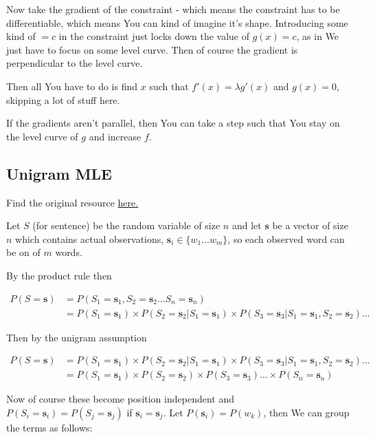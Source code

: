 \documentclass{article}
\begin{document}
		Now take the gradient of the constraint - which means the constraint has to be differentiable, which means You can kind of imagine it's shape. Introducing some kind of $=c$ in the constraint just locks down the value of $g(x)=c$, as in We just have to focus on some level curve. Then of course the gradient is perpendicular to the level curve.
		
		Then all You have to do is find $x$ such that $f'(x) = \lambda g'(x)$ and $g(x)=0$, skipping a lot of stuff here.
		
		If the gradients aren't parallel, then You can take a step such that You stay on the level curve of $g$ and increase $f$.
		
	\subsection{Unigram MLE}
	
		Find the original resource \href{https://leimao.github.io/blog/Maximum-Likelihood-Estimation-Ngram/}{here.}
		
		Let $S$ (for sentence) be the random variable of size $n$ and let $\mathbf{s}$ be a vector of size $n$ which contains actual observations, $\mathbf{s}_i\in\{ w_1\ldots w_m \}$, so each observed word can be on of $m$ words.
		
		By the product rule then
		
		\begin{align}
			P(S=\mathbf{s}) &= P(S_1=\mathbf{s}_1, S_2=\mathbf{s}_2\ldots S_n=\mathbf{s}_n)\\
			&= P(S_1=\mathbf{s}_1)\times P(S_2=\mathbf{s}_2 | S_1=\mathbf{s}_1) \times P(S_3=\mathbf{s}_3 | S_1=\mathbf{s}_1, S_2=\mathbf{s}_2)...
		\end{align}		
			
		Then by the unigram assumption
		
		\begin{align}
			P(S=\mathbf{s}) &= P(S_1=\mathbf{s}_1)\times P(S_2=\mathbf{s}_2 | S_1=\mathbf{s}_1) \times P(S_3=\mathbf{s}_3 | S_1=\mathbf{s}_1, S_2=\mathbf{s}_2)...\\
			&= P(S_1=\mathbf{s}_1)\times P(S_2=\mathbf{s}_2)\times P(S_3=\mathbf{s}_3)\ldots \times P(S_n=\mathbf{s}_n)
		\end{align}
		
		Now of course these become position independent and $P(S_i=\mathbf{s}_i) = P(S_j=\mathbf{s}_j)$ if $\mathbf{s}_i = \mathbf{s}_j$. Let $P(\mathbf{s}_i) = P(w_k)$, then We can group the terms as follows:
		
\end{document}
